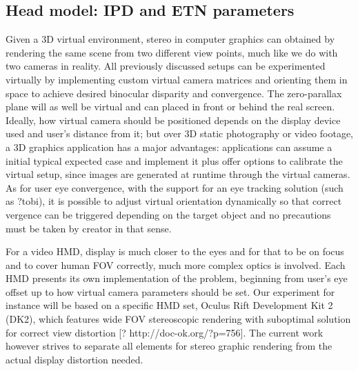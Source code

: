 \subsection{Head model: IPD and ETN parameters}
Given a 3D virtual environment, stereo in computer graphics can obtained by rendering the same scene from two different view points, much like we do with two cameras in reality. All previously discussed setups can be experimented virtually by implementing custom virtual camera matrices and orienting them in space to achieve desired binocular disparity and convergence. The zero-parallax plane will as well be virtual and can placed in front or behind the real screen. Ideally, how virtual camera should be positioned depends on the display device used and user's distance from it; but over 3D static photography or video footage, a 3D graphics application has a major advantages: applications can assume a initial typical expected case and implement it plus offer options to calibrate the virtual setup, since images are generated at runtime through the virtual cameras. As for user eye convergence, with the support for an eye tracking solution (such as ?tobi), it is possible to adjust virtual orientation dynamically so that correct vergence can be triggered depending on the target object and no precautions must be taken by creator in that sense.

For a video HMD, display is much closer to the eyes and for that to be on focus and to cover human FOV correctly, much more complex optics is involved. Each HMD presents its own implementation of the problem, beginning from user's eye offset up to how virtual camera parameters should be set. Our experiment for instance will be based on a specific HMD set, Oculus Rift Development Kit 2 (DK2), which features wide FOV stereoscopic rendering with suboptimal solution for correct view distortion [? http://doc-ok.org/?p=756]. The current work however strives to separate all elements for stereo graphic rendering from the actual display distortion needed.

